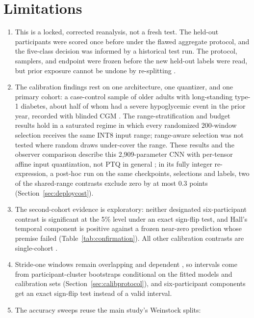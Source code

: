 \documentclass[10pt,twocolumn]{article}
\begin{document}
\section{Limitations}
\label{sec:limitations}

\begin{enumerate}
    \item This is a locked, corrected reanalysis, not a fresh test. The
    held-out participants were scored once before under the flawed
    aggregate protocol, and the five-class decision was informed by a
    historical test run. The protocol, samplers, and endpoint were frozen
    before the new held-out labels were read, but prior exposure cannot be
    undone by re-splitting \cite{kapoor2023leakage}.
    \item The calibration findings rest on one architecture, one
    quantizer, and one primary cohort: a case-control sample of older
    adults with long-standing type-1 diabetes, about half of whom had a
    severe hypoglycemic event in the prior year, recorded with blinded CGM
    \cite{weinstock2016risk}. The range-stratification and budget results
    hold in a saturated regime in which every randomized 200-window
    selection receives the same INT8 input range; range-aware selection was
    not tested where random draws under-cover the range. These
    results and the observer comparison describe this 2,909-parameter CNN
    with per-tensor affine input quantization, not PTQ in general
    \cite{bouthillier2021variance,hubara2021smallcalibration}; in its
    fully integer re-expression, a post-hoc run on the same checkpoints,
    selections and labels, two of the shared-range contrasts exclude zero
    by at most 0.3 points (Section~\ref{sec:deploycost}).
    \item The second-cohort evidence is exploratory: neither designated
    six-participant contrast is significant at the 5\% level under an
    exact sign-flip test, and Hall's temporal component is positive
    against a frozen near-zero prediction whose premise failed
    (Table~\ref{tab:confirmation}). All other calibration contrasts are
    single-cohort \cite{ghimire2024generalize}.
    \item Stride-one windows remain overlapping and dependent
    \cite{bergmeir2018crossvalidation}, so intervals come from
    participant-cluster bootstraps conditional on the fitted models and
    calibration sets (Section~\ref{sec:calibprotocol}), and
    six-participant components get an exact sign-flip test instead of a
    valid interval.
    \item The accuracy sweeps reuse the main study's Weinstock splits:

\end{enumerate}
\end{document}
